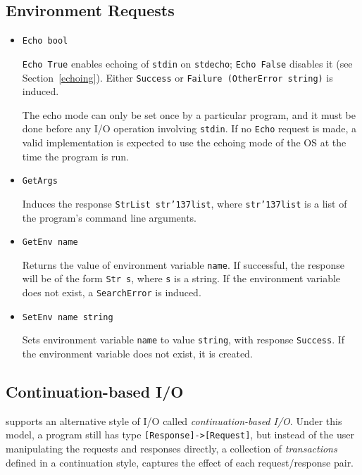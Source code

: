 \subsection{Environment Requests}
\label{environment-requests}

\begin{itemize}
\item
\mbox{\tt Echo\ bool}

\nopagebreak[4]
\mbox{\tt Echo\ True} enables echoing of \mbox{\tt stdin} on \mbox{\tt stdecho}; \mbox{\tt Echo\ False}
disables it (see Section~\ref{echoing}).  Either \mbox{\tt Success} or 
\mbox{\tt Failure\ (OtherError\ string)} is induced.

The echo mode can only be set once by a particular program, and it
must be done before any I/O operation involving \mbox{\tt stdin}.  If no \mbox{\tt Echo}
request is made, a valid implementation is expected to use the echoing
mode of the OS at the time the program is run.

\item
\mbox{\tt GetArgs}

\nopagebreak[4]
Induces the response \mbox{\tt StrList\ str{\char'137}list},
where \mbox{\tt str{\char'137}list} is a list of the program's command line arguments.

\item
\mbox{\tt GetEnv\ name}

\nopagebreak[4]
Returns the value of environment variable \mbox{\tt name}.  If successful,
the response will be of the form \mbox{\tt Str\ s}, where \mbox{\tt s} is a string.  If
the environment variable does not exist, a \mbox{\tt SearchError} is induced.

\item
\mbox{\tt SetEnv\ name\ string}

\nopagebreak[4]
Sets environment variable \mbox{\tt name} to value \mbox{\tt string}, with response \mbox{\tt Success}.
If the environment variable does not exist, it is created.
\end{itemize}

\subsection{Continuation-based I/O}
\label{continuation-io}

\Haskell{} supports an alternative
style of I/O called {\em continuation-based I/O}.  Under this model, a
\Haskell{} program still has type
\mbox{\tt [Response]->[Request]}, but instead of the user manipulating the
requests and responses directly, a collection of {\em 
transactions} defined in a continuation style,
captures the effect of each request/response pair.

